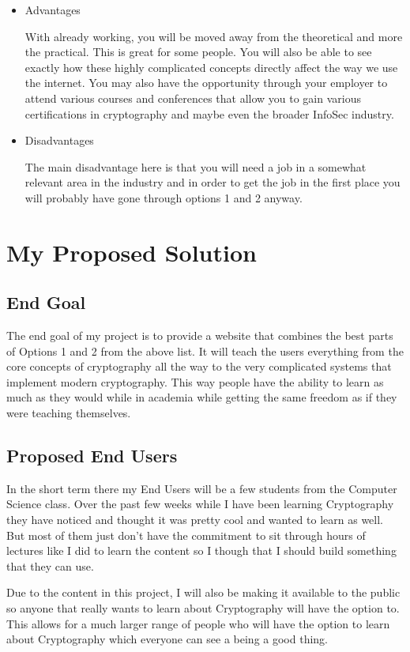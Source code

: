 \begin{itemize}
\item{Advantages 

With already working, you will be moved away from the theoretical and more the practical. This is great for some people. You will also be able to see exactly how these highly complicated concepts directly affect the way we use the internet. You may also have the opportunity through your employer to attend various courses and conferences that allow you to gain various certifications in cryptography and maybe even the broader InfoSec industry.
}
\item{Disadvantages

The main disadvantage here is that you will need a job in a somewhat relevant area in the industry and in order to get the job in the first place you will probably have gone through options 1 and 2 anyway.
}
\end{itemize} 

\section{My Proposed Solution}
\subsection{End Goal}

The end goal of my project is to provide a website that combines the best parts of Options 1 and 2 from the above list. It will teach the users everything from the core concepts of cryptography all the way to the very complicated systems that implement modern cryptography. This way people have the ability to learn as much as they would while in academia while getting the same freedom as if they were teaching themselves. 

\subsection{Proposed End Users}

In the short term there my End Users will be a few students from the Computer Science class. Over the past few weeks while I have been learning Cryptography they have noticed and thought it was pretty cool and wanted to learn as well. But most of them just don't have the commitment to sit through hours of lectures like I did to learn the content so I though that I should build something that they can use.

Due to the content in this project, I will also be making it available to the public so anyone that really wants to learn about Cryptography will have the option to. This allows for a much larger range of people who will have the option to learn about Cryptography which everyone can see a being a good thing.

